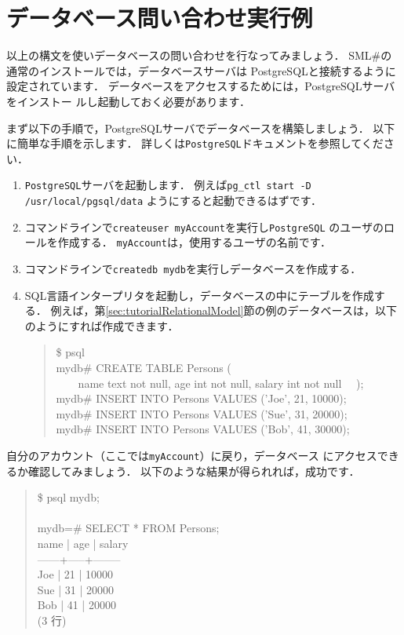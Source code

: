 \documentclass{jbook}
\newif\ifjp
\newcommand{\txt}[2]{#1}
\newcommand{\smlsharp}{SML\#}
\newcommand{\myem}{\mbox{\ \ }}
\newenvironment{program}{\begin{quote}\begin{tt}}%
                        {\end{tt}\end{quote}}
\begin{document}
\section{\txt{データベース問い合わせ実行例}{Query examples}}
\label{sec:tutorialSQLExample}

\ifjp%
	以上の構文を使いデータベースの問い合わせを行なってみましょう．
	\smlsharp{}の通常のインストールでは，データベースサーバは
PostgreSQLと接続するように設定されています．
	データベースをアクセスするためには，PostgreSQLサーバをインストー
ルし起動しておく必要があります． 
	
	まず以下の手順で，PostgreSQLサーバでデータベースを構築しましょう．
	以下に簡単な手順を示します．
	詳しくは{\tt PostgreSQL}ドキュメントを参照してください．
\begin{enumerate}
\item {\tt PostgreSQL}サーバを起動します．
	例えば{\tt pg\_ctl start -D /usr/local/pgsql/data}
ようにすると起動できるはずです．
\item コマンドラインで{\tt createuser myAccount}を実行し{\tt PostgreSQL}
のユーザのロールを作成する．
	{\tt myAccount}は，使用するユーザの名前です．
\item 
コマンドラインで{\tt createdb mydb}を実行しデータベースを作成する．
\begin{quote}

\end{quote}
\item SQL言語インタープリタを起動し，データベースの中にテーブルを作成す
る．
	例えば，第\ref{sec:tutorialRelationalModel}節の例のデータベースは，以下
のようにすれば作成できます．
\begin{program}
\$ psql\\
mydb\# CREATE TABLE Persons (\\
\myem\myem name text not null, age int not null, salary int not null
\myem );\\
mydb\# INSERT INTO Persons VALUES ('Joe', 21, 10000);\\
mydb\# INSERT INTO Persons VALUES ('Sue', 31, 20000);\\
mydb\# INSERT INTO Persons VALUES ('Bob', 41, 30000);\\
\end{program}
\end{enumerate}
	自分のアカウント（ここでは{\tt myAccount}）に戻り，データベース
にアクセスできるか確認してみましょう．
	以下のような結果が得られれば，成功です．
\begin{program}
\$ psql mydb;\\
\\
mydb=\# SELECT * FROM Persons;\\
 name | age | salary \\
------+-----+--------\\
 Joe  |  21 |  10000\\
 Sue  |  31 |  20000\\
 Bob  |  41 |  20000\\
(3 行)
\end{program}
\end{document}
